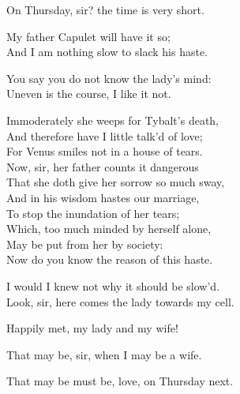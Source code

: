  
\begin{speech}
On Thursday, sir? the time is very short. \\
\end{speech}
\begin{speech}
My father Capulet will have it so; \\
And I am nothing slow to slack his haste. \\
\end{speech}
\begin{speech}
You say you do not know the lady's mind: \\
Uneven is the course, I like it not. \\
\end{speech}
\begin{speech}
Immoderately she weeps for Tybalt's death, \\
And therefore have I little talk'd of love; \\
For Venus smiles not in a house of tears. \\
Now, sir, her father counts it dangerous \\
That she doth give her sorrow so much sway, \\
And in his wisdom hastes our marriage, \\
To stop the inundation of her tears; \\
Which, too much minded by herself alone, \\
May be put from her by society: \\
Now do you know the reason of this haste. \\
\end{speech}
\begin{speech}
 I would I knew not why it should be slow'd.
\\
Look, sir, here comes the lady towards my cell. 
\\
\end{speech}
\begin{speech}
Happily met, my lady and my wife! \\
\end{speech}
\begin{speech}
That may be, sir, when I may be a wife. \\
\end{speech}
\begin{speech}
That may be must be, love, on Thursday next. \\
\end{speech}

